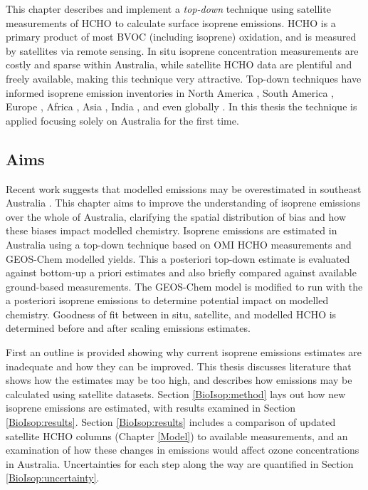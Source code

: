 \documentclass[acp, manuscript]{copernicus}
\newcommand{\parencite}{\citep}
\begin{document}
This chapter describes and implement a \textit{top-down} technique using satellite measurements of HCHO to calculate surface isoprene emissions.
HCHO is a primary product of most BVOC (including isoprene) oxidation, and is measured by satellites via remote sensing.
In situ isoprene concentration measurements are costly and sparse within Australia, while satellite HCHO data are plentiful and freely available, making this technique very attractive.
Top-down techniques have informed isoprene emission inventories in North America \parencite{Abbot2003,Palmer2003,Palmer2006,Millet2006,Millet2008}, South America \parencite{Barkley2013}, Europe \parencite{Dufour2009,Curci2010}, Africa \parencite{Marais2012}, Asia \parencite{Fu2007,Stavrakou2014}, India \parencite{Surl2018}, and even globally \parencite{Shim2005,FortemsCheiney2012,Bauwens2016}.
In this thesis the technique is applied focusing solely on Australia for the first time.

\subsection{Aims}
\label{BioIsop:intro:aims}

Recent work suggests that modelled emissions may be overestimated in southeast Australia \parencite{Emmerson2016}.
This chapter aims to improve the understanding of isoprene emissions over the whole of Australia, clarifying the spatial distribution of bias and how these biases impact modelled chemistry.
Isoprene emissions are estimated in Australia using a top-down technique based on OMI HCHO measurements and GEOS-Chem modelled yields.
This a posteriori top-down estimate is evaluated against bottom-up a priori estimates and also briefly compared against available ground-based measurements.
The GEOS-Chem model is modified to run with the a posteriori isoprene emissions to determine potential impact on modelled chemistry.
Goodness of fit between in situ, satellite, and modelled HCHO is determined before and after scaling emissions estimates.


First an outline is provided showing why current isoprene emissions estimates are inadequate and how they can be improved.
This thesis discusses literature that shows how the estimates may be too high, and describes how emissions may be calculated using satellite datasets.
Section \ref{BioIsop:method} lays out how new isoprene emissions are estimated, with results examined in Section \ref{BioIsop:results}. 
Section \ref{BioIsop:results} includes a comparison of updated satellite HCHO columns (Chapter \ref{Model}) to available measurements, and an examination of how these changes in emissions would affect ozone concentrations in Australia.
Uncertainties for each step along the way are quantified in Section \ref{BioIsop:uncertainty}.
\end{document}
